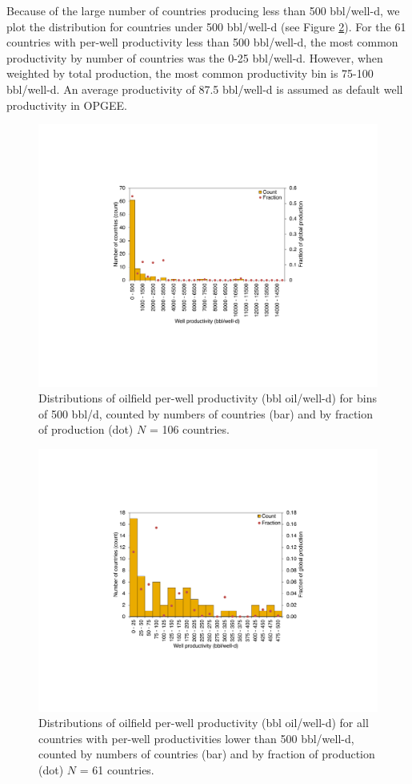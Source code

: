 \documentclass[11pt]{report}
\begin{document}
Because of the large number of countries producing less than 500 bbl/well-d, we plot the distribution for countries under 500 bbl/well-d (see Figure \ref{fig:productivity_distribution_low}). For the 61 countries with per-well productivity less than 500 bbl/well-d, the most common productivity by number of countries was the 0-25 bbl/well-d. However, when weighted by total production, the most common productivity bin is 75-100 bbl/well-d. An average productivity of 87.5 bbl/well-d is assumed as default well productivity in OPGEE. 


\begin{figure}[t]
\includegraphics[width=0.8\columnwidth]{images/well_prod_all.pdf}
\caption{Distributions of oilfield per-well productivity (bbl oil/well-d) for bins of 500 bbl/d, counted by numbers of countries (bar) and by fraction of production (dot) $N$ = 106 countries.}
\label{fig:productivity_distribution_all}
\end{figure}

\begin{figure}[t]
\includegraphics[width=0.8\columnwidth]{images/well_prod_low.pdf}
\caption{Distributions of oilfield per-well productivity (bbl oil/well-d) for all countries with per-well productivities lower than 500 bbl/well-d, counted by numbers of countries (bar) and by fraction of production (dot) $N$ = 61 countries.}
\label{fig:productivity_distribution_low}
\end{figure}
\end{document}
